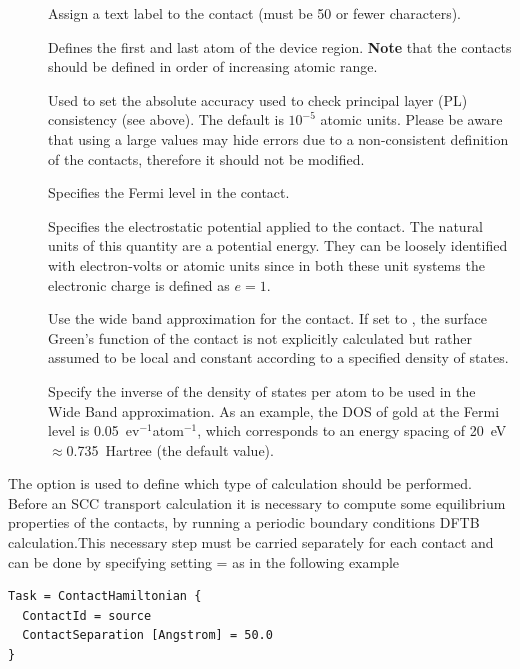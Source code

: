 \begin{description}
\item[] Assign a text label to the contact (must be 50 or fewer
  characters).
\item[] \label{AtomRange} Defines the first and last atom of the
  device region.  {\bf Note} that the contacts should be defined in order of
  increasing atomic range.
\item[] Used to set the absolute
  accuracy used to check principal layer (PL) consistency (see above). The
  default is $10^{-5}$ atomic units. Please be aware that using a large values
  may hide errors due to a non-consistent definition of the contacts, therefore
  it should not be modified.
\item[] Specifies the Fermi level in the
  contact.
\item[] Specifies the electrostatic
  potential applied to the contact. The natural units of this quantity are a
  potential energy. They can be loosely identified with electron-volts or atomic
  units since in both these unit systems the electronic charge is defined as
  $e=1$.
\item[] Use the wide band approximation for the contact. If set to
  , the surface Green's function of the contact is not explicitly
  calculated but rather assumed to be local and constant according to a
  specified density of states.
\item[] Specify the inverse of the
  density of states per atom to be used in the Wide Band approximation. As an
  example, the DOS of gold at the Fermi level is 0.05~ev$^{-1}$atom$^{-1}$,
  which corresponds to an energy spacing of 20~eV $\approx$0.735~Hartree (the
  default value).
\end{description}

 \label{Task} The  option is
used to define which type of calculation should be performed. Before an SCC
transport calculation it is necessary to compute some equilibrium properties of
the contacts, by running a periodic boundary conditions DFTB calculation.This
necessary step must be carried separately for each contact and can be done by
specifying setting = as in the following example

\begin{verbatim}
Task = ContactHamiltonian {
  ContactId = source
  ContactSeparation [Angstrom] = 50.0
}
\end{verbatim}

